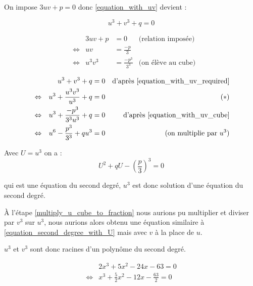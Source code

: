 \documentclass[]{../templates/homework}
\begin{document}
\question On impose $3uv + p = 0$ donc \eqref{equation_with_uv} devient :

\begin{equation*}
	u^3 + v^3 + q = 0 \tag{$E_3$} \label{equation_with_uv_required}
\end{equation*}

\question

\begin{align*}
	 &                 & 3uv + p & = 0                & \text{(relation imposée)}                                           \\
	 & \Leftrightarrow & uv      & = \frac{-p}{3}     &                                                                     \\
	 & \Leftrightarrow & u^3v^3  & = \frac{-p^3}{3^3} & \text{(on élève au cube)} \tag{$E_4$} \label{equation_with_uv_cube}
\end{align*}

\question

\begin{align*}
	 &                 & u^3 + v^3 + q                 & = 0 & \text{d'après \eqref{equation_with_uv_required}} \\
	 & \Leftrightarrow & u^3 + \frac{u^3v^3}{u^3} + q  & = 0 & \tag{$\ast$} \label{multiply_u_cube_to_fraction} \\
	 & \Leftrightarrow & u^3 + \frac{-p^3}{3^3u^3} + q & = 0 & \text{d'après \eqref{equation_with_uv_cube}}     \\
	 & \Leftrightarrow & u^6 - \frac{p^3}{3^3} + qu^3  & = 0 & \text{(on multiplie par $u^3$)}
\end{align*}

Avec $U = u^3$ on a :
\begin{equation}
	\tag{$E_5$}
	U^2 + qU - \left(\frac{p}{3}\right)^3 = 0
	\label{equation_second_degree_with_U}
\end{equation}

qui est une équation du second degré, $u^3$ est donc solution d'une équation du second degré.

À l'étape \eqref{multiply_u_cube_to_fraction} nous aurions pu multiplier et diviser par $v^3$ sur $u^3$, nous aurions alors obtenu une équation similaire à \eqref{equation_second_degree_with_U} mais avec $v$ à la place de $u$.

$u^3$ et $v^3$ sont donc racines d'un polynôme du second degré.


\begin{align*}
	& 2x^3 + 5x^2 - 24x - 63 = 0 \\
	\iff & x^3 + \frac{5}{2}x^2 - 12x - \frac{63}{2} = 0
\end{align*}
\end{document}
